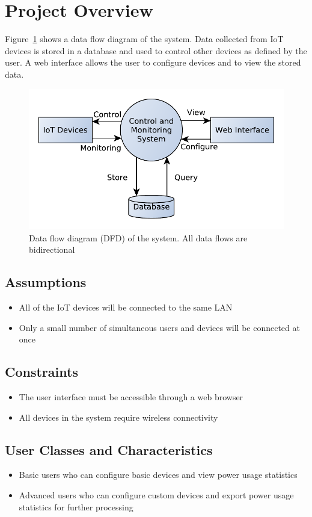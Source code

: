 \documentclass[11pt, a4paper]{article}
\begin{document}
	\section{Project Overview}
	
	Figure~\ref{fig:dfd} shows a data flow diagram of the system. Data collected from IoT devices is stored in a database and used to control other devices as defined by the user. A web interface allows the user to configure devices and to view the stored data.
	\begin{figure}[!htb]
		\includegraphics[width=\columnwidth]{data-flow-1}
		\caption{Data flow diagram (DFD) of the system. All data flows are bidirectional}
		\label{fig:dfd}
	\end{figure}
	\newpage
	\subsection{Assumptions}
	\begin{itemize}
		\item All of the IoT devices will be connected to the same LAN
		\item Only a small number of simultaneous users and devices will be connected at once
	\end{itemize}
	\subsection{Constraints}
	\begin{itemize}
		\item The user interface must be accessible through a web browser
		\item All devices in the system require wireless connectivity
	\end{itemize}
	
	\subsection{User Classes and Characteristics}
	\begin{itemize}
		\item Basic users who can configure basic devices and view power usage statistics
		\item Advanced users who can configure custom devices and export power usage statistics for further processing
	\end{itemize}
	
\end{document}
